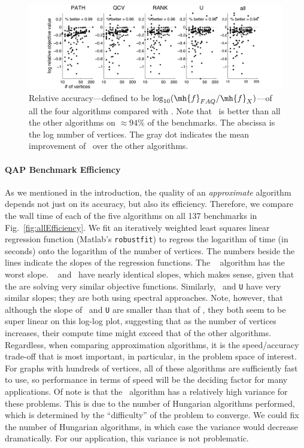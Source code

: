 \documentclass{article} %
\begin{document}
\begin{figure}[htbp]
	\centering
		\includegraphics[width=1.0\linewidth]{../figs/allRelAccuracy.pdf}
	\caption{Relative accuracy---defined to be $\log_{10}(\mh{f}_{FAQ}/\mh{f}_X)$---of all the four algorithms compared with \FAQ.  Note that \FAQ\  is better than all the other algorithms on $\approx 94\%$ of the benchmarks. The abscissa is the log number of vertices.  The gray dot indicates the mean improvement of \FAQ\  over the other algorithms.}
	\label{fig:allRelAccuracy}
\end{figure}
\vspace{-10pt}


\vspace{-5pt}
\paragraph{QAP Benchmark Efficiency} %
\label{sub:efficiency}


As we mentioned in the introduction, the quality of an \emph{approximate} algorithm depends not just on its accuracy, but also its efficiency.  Therefore, we compare the wall time of each of the five algorithms on all 137 benchmarks in Fig.\ \ref{fig:allEfficiency}.  We fit an iteratively weighted least squares linear regression function (Matlab's \texttt{robustfit}) to regress the logarithm of time (in seconds) onto the logarithm of the number of vertices.  The numbers beside the lines indicate the slopes of the regression functions.  The \Path~ algorithm has the worst slope.  \Qcv~ and \FAQ\  have nearly identical slopes, which makes sense, given that the are solving very similar objective functions.  Similarly, \Rank~and \texttt{U} have very similar slopes; they are both using spectral approaches.  Note, however, that although the slope of \Rank~and \texttt{U} are smaller than that of \FAQ, they both seem to be super linear on this log-log plot, suggesting that as the number of vertices increases, their compute time might exceed that of the other algorithms.  Regardless, when comparing approximation algorithms, it is the speed/accuracy trade-off that is most important, in particular, in the problem space of interest.  For graphs with hundreds of vertices, all of these algorithms are sufficiently fast to use, so performance in terms of speed will be the deciding factor for many applications.  Of note is that the \FAQ\  algorithm has a relatively high variance for these problems.  This is due to the number of Hungarian algorithms performed, which is determined by the ``difficulty'' of the problem to converge.  We could fix the number of Hungarian algorithms, in which case the variance would decrease dramatically.  For our application, this variance is not problematic.
\end{document}
